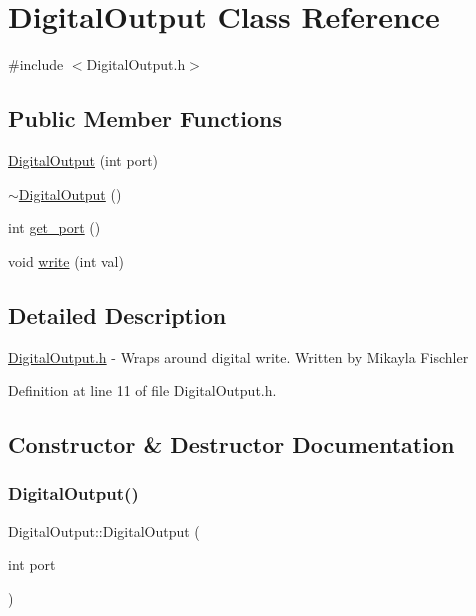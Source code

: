 \hypertarget{class_digital_output}{}\section{Digital\+Output Class Reference}
\label{class_digital_output}


{\ttfamily \#include $<$Digital\+Output.\+h$>$}

\subsection*{Public Member Functions}
\begin{DoxyCompactItemize}
\item 
\hyperlink{class_digital_output_a5be5029deda67b7ce1142512bab1901a}{Digital\+Output} (int port)
\item 
\hyperlink{class_digital_output_a442e379ebfbd2939d568809dad9c0ba2}{$\sim$\+Digital\+Output} ()
\item 
int \hyperlink{class_digital_output_a6b05ec0083899a814df78b376e1ab8cd}{get\+\_\+port} ()
\item 
void \hyperlink{class_digital_output_a6c2f1937df48d1ccb7f74f5e92a60943}{write} (int val)
\end{DoxyCompactItemize}


\subsection{Detailed Description}
\hyperlink{_digital_output_8h}{Digital\+Output.\+h} -\/ Wraps around digital write. Written by Mikayla Fischler 

Definition at line 11 of file Digital\+Output.\+h.



\subsection{Constructor \& Destructor Documentation}
\mbox{\label{class_digital_output_a5be5029deda67b7ce1142512bab1901a}} 
\subsubsection{\texorpdfstring{Digital\+Output()}{DigitalOutput()}}
{\footnotesize\ttfamily Digital\+Output\+::\+Digital\+Output (\begin{DoxyParamCaption}\item[{int}]{port }\end{DoxyParamCaption})}

